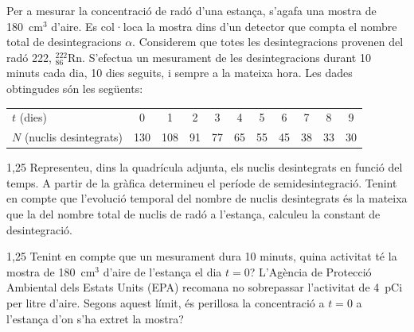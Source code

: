 Per a mesurar la concentració de radó d'una estança, s'agafa una mostra de 180~cm$^3$ d'aire. Es col·loca la mostra dins d'un detector que compta el nombre total de desintegracions $\alpha$. Considerem que totes les desintegracions provenen del radó 222, $^{222}_{86}\mathrm{Rn}$. S'efectua un mesurament de les desintegracions durant 10 minuts cada dia, 10 dies seguits, i sempre a la mateixa hora. Les dades obtingudes són les següents:

\begin{center}
\begin{tabular}{l*{10}{c}}
\toprule
$t$ (dies) & 0 & 1 & 2 & 3 & 4 & 5 & 6 & 7 & 8 & 9 \\
$N$ (nuclis desintegrats) & 130 & 108 & 91 & 77 & 65 & 55 & 45 & 38 & 33 & 30 \\
\bottomrule
\end{tabular}
\end{center}


\begin{apartat}{1,25}
Representeu, dins la quadrícula adjunta, els nuclis desintegrats en funció del temps. A partir de la gràfica determineu el període de semidesintegració. Tenint en compte que l'evolució temporal del nombre de nuclis desintegrats és la mateixa que la del nombre total de nuclis de radó a l'estança, calculeu la constant de desintegració.
\end{apartat}

\begin{apartat}{1,25}
Tenint en compte que un mesurament dura 10 minuts, quina activitat té la mostra de 180~cm$^3$ d'aire de l'estança el dia $t = 0$? L'Agència de Protecció Ambiental dels Estats Units (EPA) recomana no sobrepassar l'activitat de 4~pCi per litre d'aire. Segons aquest límit, és perillosa la concentració a $t = 0$ a l'estança d'on s'ha extret la mostra?
\end{apartat}

